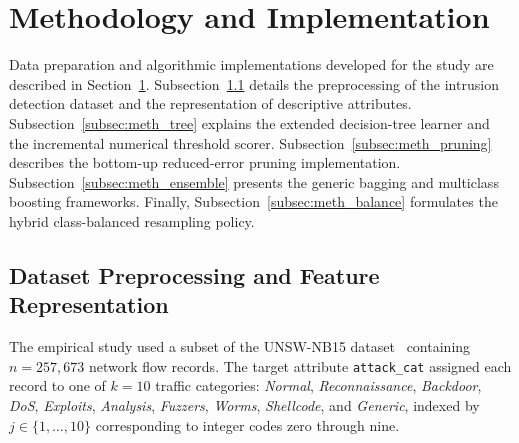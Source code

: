 \section{Methodology and Implementation}
\label{sec:methodology}

Data preparation and algorithmic implementations developed for the study are described in Section~\ref{sec:methodology}. Subsection~\ref{subsec:meth_data} details the preprocessing of the intrusion detection dataset and the representation of descriptive attributes. Subsection~\ref{subsec:meth_tree} explains the extended decision-tree learner and the incremental numerical threshold scorer. Subsection~\ref{subsec:meth_pruning} describes the bottom-up reduced-error pruning implementation. Subsection~\ref{subsec:meth_ensemble} presents the generic bagging and multiclass boosting frameworks. Finally, Subsection~\ref{subsec:meth_balance} formulates the hybrid class-balanced resampling policy.

\subsection{Dataset Preprocessing and Feature Representation}
\label{subsec:meth_data}
The empirical study used a subset of the UNSW-NB15 dataset~\cite{Moustafa2015} containing $n = 257{,}673$ network flow records. The target attribute \texttt{attack\_cat} assigned each record to one of $k = 10$ traffic categories: \emph{Normal}, \emph{Reconnaissance}, \emph{Backdoor}, \emph{DoS}, \emph{Exploits}, \emph{Analysis}, \emph{Fuzzers}, \emph{Worms}, \emph{Shellcode}, and \emph{Generic}, indexed by $j \in \{1, \dots, 10\}$ corresponding to integer codes zero through nine.

